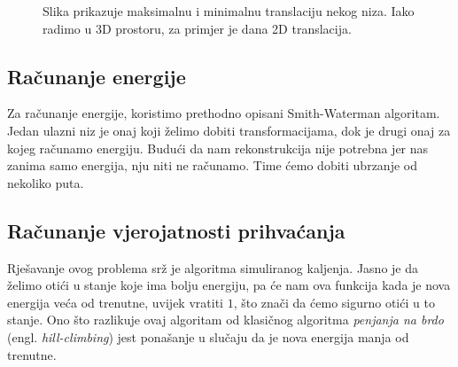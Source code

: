 \documentclass[times, utf8, zavrsni]{fer}
\begin{document}
\begin{figure}
\centering
{}
\caption[Translacija nizova]{Slika prikazuje
maksimalnu i minimalnu translaciju nekog niza. 
Iako radimo u 3D prostoru, za primjer je dana 2D
translacija.}
\label{figure:susjed:translacija}
\end{figure}

\subsection{Računanje energije}
Za računanje energije, koristimo prethodno opisani Smith-Waterman algoritam. 
Jedan ulazni niz je onaj koji želimo dobiti transformacijama, dok je drugi
onaj za kojeg računamo energiju. 
Budući da nam rekonstrukcija nije potrebna jer nas zanima samo energija,
nju niti ne računamo. Time ćemo dobiti ubrzanje od nekoliko puta.


\subsection{Računanje vjerojatnosti prihvaćanja}
Rješavanje ovog problema srž je algoritma simuliranog kaljenja. 
Jasno je da želimo otići u stanje koje ima bolju energiju, pa
će nam ova funkcija kada je nova energija veća od trenutne, uvijek
vratiti $1$, što znači da ćemo sigurno otići u to stanje. 
Ono što razlikuje ovaj algoritam od klasičnog algoritma
\textit{penjanja na brdo} (engl. \textit{hill-climbing}) jest 
ponašanje u slučaju da je nova energija manja od trenutne. 
\end{document}
